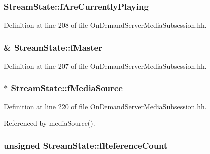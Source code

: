 \subsubsection[{f\+Are\+Currently\+Playing}]{ Stream\+State\+::f\+Are\+Currently\+Playing\hspace{0.3cm}{\ttfamily [private]}}\label{classStreamState_a3925a0326cc663be2f5b385911454c9c}


Definition at line 208 of file On\+Demand\+Server\+Media\+Subsession.\+hh.

\subsubsection[{f\+Master}]{\& Stream\+State\+::f\+Master\hspace{0.3cm}{\ttfamily [private]}}\label{classStreamState_adba07891824b4cbb48ee9a37bdc3e0d1}


Definition at line 207 of file On\+Demand\+Server\+Media\+Subsession.\+hh.

\subsubsection[{f\+Media\+Source}]{$\ast$ Stream\+State\+::f\+Media\+Source\hspace{0.3cm}{\ttfamily [private]}}\label{classStreamState_a570c9ef21f57b9711d4e6354b8ec016d}


Definition at line 220 of file On\+Demand\+Server\+Media\+Subsession.\+hh.



Referenced by media\+Source().

\subsubsection[{f\+Reference\+Count}]{\setlength{\rightskip}{0pt plus 5cm}unsigned Stream\+State\+::f\+Reference\+Count\hspace{0.3cm}{\ttfamily [private]}}\label{classStreamState_a34b99f7c2729ce52c321e2344c3d5122}


